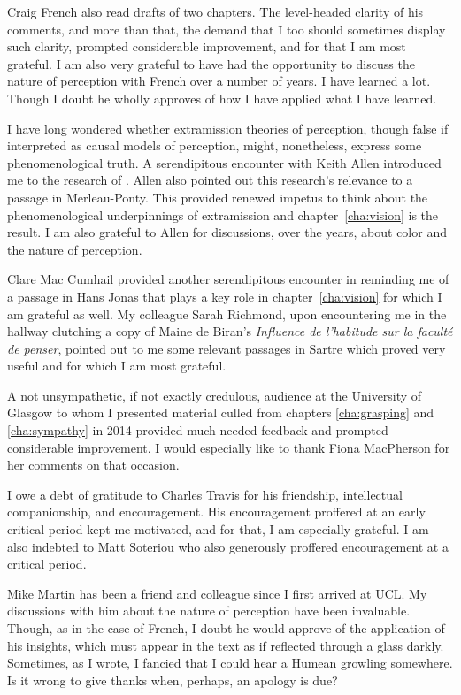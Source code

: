 Craig French also read drafts of two chapters. The level-headed clarity of his comments, and more than that, the demand that I too should sometimes display such clarity, prompted considerable improvement, and for that I am most grateful. I am also very grateful to have had the opportunity to discuss the nature of perception with French over a number of years. I have learned a lot. Though I doubt he wholly approves of how I have applied what I have learned.

I have long wondered whether extramission theories of perception, though false if interpreted as causal models of perception, might, nonetheless, express some phenomenological truth. A serendipitous encounter with Keith Allen introduced me to the research of \citet{Winer:1996as}. Allen also pointed out this research's relevance to a passage in Merleau-Ponty. This provided renewed impetus to think about the phenomenological underpinnings of extramission and chapter~\ref{cha:vision} is the result. I am also grateful to Allen for discussions, over the years, about color and the nature of perception.

Clare Mac Cumhail provided another serendipitous encounter in reminding me of a passage in Hans Jonas that plays a key role in chapter~\ref{cha:vision} for which I am grateful as well. My colleague Sarah Richmond, upon encountering me in the hallway clutching a copy of Maine de Biran's \emph{Influence de l'habitude sur la facult\'{e} de penser}, pointed out to me some relevant passages in Sartre which proved very useful and for which I am most grateful.

A not unsympathetic, if not exactly credulous, audience at the University of Glasgow to whom I presented material culled from chapters \ref{cha:grasping} and \ref{cha:sympathy} in 2014 provided much needed feedback and prompted considerable improvement. I would especially like to thank Fiona MacPherson for her comments on that occasion.

I owe a debt of gratitude to Charles Travis for his friendship, intellectual companionship, and encouragement. His encouragement proffered at an early critical period kept me motivated, and for that, I am especially grateful. I am also indebted to Matt Soteriou who also generously proffered encouragement at a critical period.

Mike Martin has been a friend and colleague since I first arrived at UCL. My discussions with him about the nature of perception have been invaluable. Though, as in the case of French, I doubt he would approve of the application of his insights, which must appear in the text as if reflected through a glass darkly. Sometimes, as I wrote, I fancied that I could hear a Humean growling somewhere. Is it wrong to give thanks when, perhaps, an apology is due?

